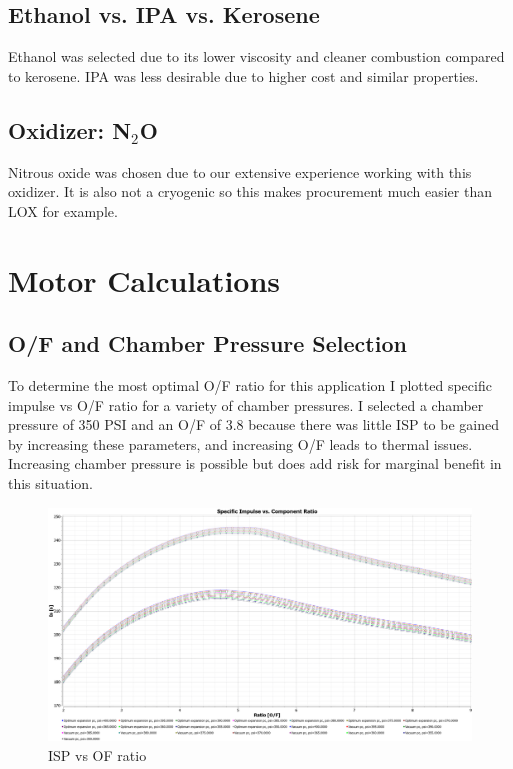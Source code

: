 \subsection{Ethanol vs. IPA vs. Kerosene}
Ethanol was selected due to its lower viscosity and cleaner combustion compared to kerosene. IPA was less desirable due to higher cost and similar properties.

\subsection{Oxidizer: N$_2$O}
Nitrous oxide was chosen due to our extensive experience working with this oxidizer. It is also not a cryogenic so this makes procurement much easier than LOX for example.

\section{Motor Calculations} 



\subsection{O/F and Chamber Pressure Selection}
To determine the most optimal O/F ratio for this application I plotted specific impulse vs O/F ratio for a variety of chamber pressures. I selected a chamber pressure of 350 PSI and an O/F of 3.8 because there was little ISP to be gained by increasing these parameters, and increasing O/F leads to thermal issues. Increasing chamber pressure is possible but does add risk for marginal benefit in this situation. 
\begin{figure}[H]
    \centering
    \includegraphics[width=1.0\linewidth]{Images/ispvscomponentratio.png}
    \caption{ISP vs OF ratio}
    \label{fig:enter-label}
\end{figure}

